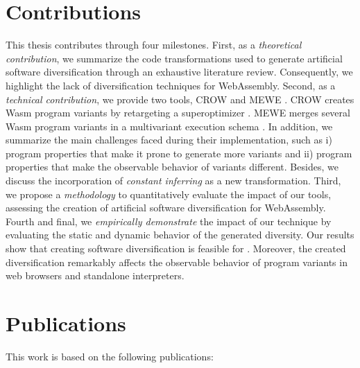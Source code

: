 \renewcommand{\rqone}{$RQ_1$. To what extent can we artifically generate program variants for WebAssembly?}

\renewcommand{\rqtwo}{$RQ_2$. To what extent are the generated variants dynamically different?}
\renewcommand{\rqthree}{$RQ_3$. To what extent do the artificial variants exhibit different execution times on edge-cloud platforms?}

\section{Contributions}

This thesis contributes through four milestones. First, as a \emph{theoretical contribution}, we summarize the code transformations used to generate artificial software diversification through an exhaustive literature review. Consequently, we highlight the lack of diversification techniques for WebAssembly.
Second, as a \emph{technical contribution}, we provide two tools, CROW \cite{CROW} and MEWE \cite{MEWE}. CROW creates 
Wasm program variants by retargeting a superoptimizer \cite{Sasnauskas2017Souper:Superoptimizer}.
MEWE merges several Wasm program variants in a multivariant execution schema \cite{okhravi2013survey}.
In addition, we summarize the main challenges faced during their implementation, such as i) program properties that make it prone to generate more variants and ii) program properties that make the observable behavior of variants different. 
Besides, we discuss the incorporation of \emph{constant inferring} as a new transformation. 
Third, we propose a \emph{methodology} to quantitatively evaluate the impact of our tools, assessing the creation of artificial software diversification for WebAssembly. 
Fourth and final, we \emph{empirically demonstrate} the impact of our technique by evaluating the static and dynamic behavior of the generated diversity.
Our results show that creating software diversification is feasible for \wasm. 
Moreover, the created diversification remarkably affects the observable behavior of program variants in web browsers and standalone interpreters.

\section{Publications}

This work is based on the following publications:

